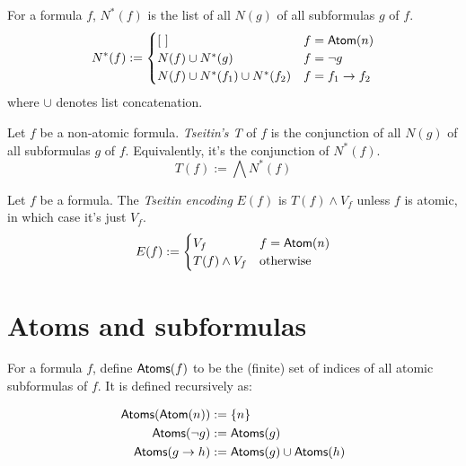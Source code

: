 \begin{definition}
    \label{Ns}
    \leanok
    For a formula $f$, $N^*(f)$ is the list of all $N(g)$ of all subformulas $g$ of $f$.
    \[
    N^*(f) :=
    \begin{cases}
        [\ ] & f = \mathsf{Atom}(n) \\
        N(f) \cup N^*(g) & f = \neg g \\
        N(f) \cup N^*(f_1) \cup N^*(f_2) & f = f_1 \to f_2
    \end{cases}
    \]
    where $\cup$ denotes list concatenation.
\end{definition}

\begin{definition}
    \label{T}
    \leanok
    Let $f$ be a non-atomic formula.
    \emph{Tseitin's T} of $f$ is the conjunction of all $N(g)$ of all subformulas $g$ of $f$.
    Equivalently, it's the conjunction of $N^*(f)$.
    \[
    T(f) := \bigwedge N^*(f)
    \]
\end{definition}

\begin{definition}
    \label{E}
    \leanok
    Let $f$ be a formula.
    The \emph{Tseitin encoding} $E(f)$ is $T(f) \land V_f$ unless $f$ is atomic, in which case it's just $V_f$.
    \[
    E(f) := \begin{cases}
        V_f & f = \mathsf{Atom}(n) \\
        T(f) \wedge V_f & \text{otherwise}\\
    \end{cases}
    \]
\end{definition}

\section{Atoms and subformulas}

\begin{definition}
    \label{Atoms}
    \leanok
    For a formula $f$, define $\mathsf{Atoms}(f)$ to be the (finite) set of indices of all atomic subformulas of $f$.
    It is defined recursively as:

    \[
    \begin{aligned}
        \mathsf{Atoms}(\mathsf{Atom}(n)) &:= \{n\} \\
        \mathsf{Atoms}(\neg g) &:= \mathsf{Atoms}(g) \\
        \mathsf{Atoms}(g \to h) &:= \mathsf{Atoms}(g) \cup \mathsf{Atoms}(h) \\
    \end{aligned}
    \]
\end{definition}

